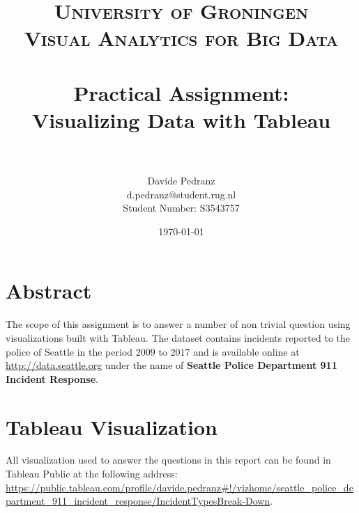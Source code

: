 \documentclass[paper=a4, fontsize=11pt]{scrartcl}
\title{	
    \normalfont
    \large \textsc{University of Groningen \\ Visual Analytics for Big Data} \\ [22pt]
    \horrule{0.5pt} \\[0.4cm]
    \huge Practical Assignment: \\ Visualizing Data with Tableau \\
    \horrule{0.5pt} \\[0.5cm]
}
\author{
    Davide Pedranz \\
    \small d.pedranz@student.rug.nl \\
    \small Student Number: S3543757    
}
\date{\vspace{0.5cm} \normalsize\today}
\numberwithin{equation}{section} %
\numberwithin{figure}{section} %
\numberwithin{table}{section} %
\begin{document}
\maketitle

\section*{Abstract}
The scope of this assignment is to answer a number of non trivial question using visualizations built with Tableau.
The dataset contains incidents reported to the police of Seattle in the period $2009$ to $2017$ and is available online at \url{http://data.seattle.org} under the name of \textbf{Seattle Police Department 911 Incident Response}.

\tableofcontents

\section*{Tableau Visualization}
All visualization used to answer the questions in this report can be found in Tableau Public at the following address:
\url{https://public.tableau.com/profile/davide.pedranz#!/vizhome/seattle_police_department_911_incident_response/IncidentTypesBreak-Down}.

\clearpage







% 
% 
\end{document}
